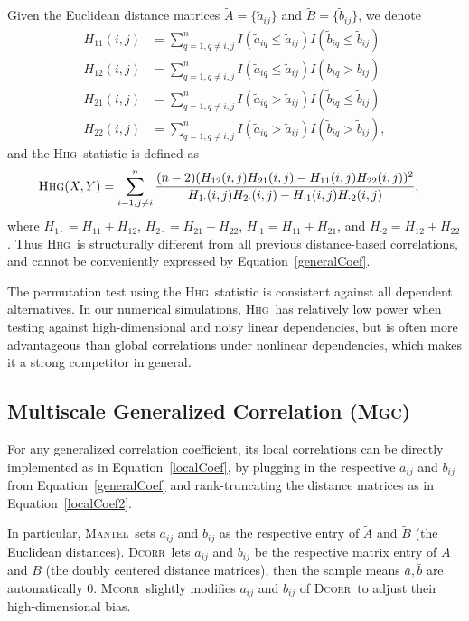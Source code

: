 \documentclass[11pt]{article}
\providecommand{\sct}[1]{{\normalfont\textsc{#1}}}
\newcommand{\Mgc}{\sct{Mgc}}
\newcommand{\Hhg}{\sct{Hhg}}
\newcommand{\Dcorr}{\sct{Dcorr}}
\newcommand{\Mcorr}{\sct{Mcorr}}
\newcommand{\Mantel}{\sct{Mantel}}
\begin{document}
Given the Euclidean distance matrices $\tilde{A}=\{\tilde{a}_{ij}\}$ and $\tilde{B}=\{\tilde{b}_{ij}\}$, we denote
\begin{align*}
H_{11}(i,j) &= \sum_{q=1,q\neq i,j}^{n}I(\tilde{a}_{iq} \leq \tilde{a}_{ij})I(\tilde{b}_{iq} \leq \tilde{b}_{ij}) \\
H_{12}(i,j) &= \sum_{q=1,q\neq i,j}^{n}I(\tilde{a}_{iq} \leq \tilde{a}_{ij})I(\tilde{b}_{iq} > \tilde{b}_{ij}) \\
H_{21}(i,j) &= \sum_{q=1,q\neq i,j}^{n}I(\tilde{a}_{iq} > \tilde{a}_{ij})I(\tilde{b}_{iq} \leq \tilde{b}_{ij}) \\
H_{22}(i,j) &= \sum_{q=1,q\neq i,j}^{n}I(\tilde{a}_{iq} > \tilde{a}_{ij})I(\tilde{b}_{iq} > \tilde{b}_{ij}),
\end{align*}
and the \Hhg~statistic is defined as
\begin{align*}
\Hhg(X,Y) &= \sum_{i=1,j\neq i}^{n} \frac{(n-2)(H_{12}(i,j)H_{21}(i,j)-H_{11}(i,j)H_{22}(i,j))^2}{H_{1 \cdot}(i,j)H_{2 \cdot}(i,j)-H_{\cdot 1}(i,j)H_{\cdot 2}(i,j)},
\end{align*}
where $H_{1 \cdot}=H_{11}+H_{12}$, $H_{2 \cdot}=H_{21}+H_{22}$, $H_{\cdot 1}=H_{11}+H_{21}$, and $H_{\cdot 2}=H_{12}+H_{22}$. Thus \Hhg~is structurally different from all previous distance-based correlations, and cannot be conveniently expressed by Equation~\ref{generalCoef}.

The permutation test using the \Hhg~statistic is consistent against all dependent alternatives. In our numerical simulations, \Hhg~has relatively low power  when testing against high-dimensional and noisy linear dependencies, but is often more advantageous than global correlations under nonlinear dependencies, which makes it a strong competitor in general.

\subsection{Multiscale Generalized Correlation (\Mgc)}
\label{appen:mgc}
For any generalized correlation coefficient, its local correlations can be directly implemented as in Equation~\ref{localCoef}, by plugging in the respective $a_{ij}$ and $b_{ij}$ from Equation~\ref{generalCoef} and rank-truncating  the distance matrices  as in Equation~\ref{localCoef2}. 

In particular, \Mantel~sets $a_{ij}$ and $b_{ij}$ as the respective entry of $\tilde{A}$ and $\tilde{B}$ (the Euclidean distances). \Dcorr~lets $a_{ij}$ and $b_{ij}$ be the respective matrix entry of $A$ and $B$ (the doubly centered distance matrices), then the sample means $\bar{a}, \bar{b}$ are automatically $0$. \Mcorr~slightly modifies $a_{ij}$ and $b_{ij}$ of \Dcorr~to adjust their high-dimensional bias. 
\end{document}
